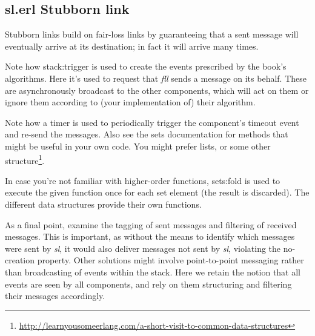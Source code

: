 \documentclass[a4paper]{article}
\begin{document}

\subsection{sl.erl Stubborn link} %
\label{ssub:sl_erl_stubborn_link}

Stubborn links build on fair-loss links by guaranteeing that a sent message
will eventually arrive at its destination; in fact it will arrive many times.

Note how stack:trigger is used to create the events prescribed by the book's
algorithms. Here it's used to request that \emph{fll} sends a message on its
behalf. These are asynchronously broadcast to the other components, which will
act on them or ignore them according to (your implementation of) their
algorithm.

Note how a timer is used to periodically trigger the component's timeout event
and re-send the messages. Also see the sets documentation for methods that
might be useful in your own code. You might prefer lists, or some other
structure\footnote{\url{http://learnyousomeerlang.com/a-short-visit-to-common-data-structures}}.

In case you're not familiar with higher-order functions, sets:fold is used to
execute the given function once for each set element (the result is
discarded). The different data structures provide their own functions.

As a final point, examine the tagging of sent messages and filtering of
received messages. This is important, as without the means to identify which
messages were sent by \emph{sl}, it would also deliver messages not sent by \emph{sl},
violating the no-creation property. Other solutions might involve
point-to-point messaging rather than broadcasting of events within the stack.
Here we retain the notion that all events are seen by all components, and
rely on them structuring and filtering their messages accordingly.

%
\end{document}

